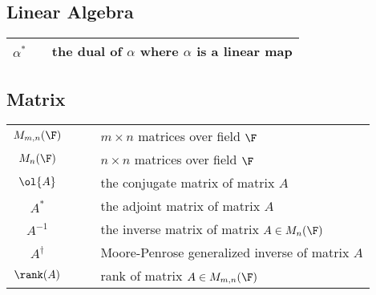 \subsection{Linear Algebra}

\begin{center}
\begin{longtable}{ccl}
\hline
$\alpha^*$ & & the dual of $\alpha$ where $\alpha$ is a linear map\\
\hline
\end{longtable}
\end{center}

\subsection{Matrix}

\begin{center}
\begin{longtable}{ccl}%
\hline
$M_{m,n}(\F)$ & $\quad$ & $m\times n$ matrices over field $\F$\\
$M_{n}(\F)$ & &  $n\times n$ matrices over field $\F$\\
$\ol{A}$ & & the conjugate matrix of matrix $A$\\
$A^*$ & & the adjoint matrix of matrix $A$\\%
$A^{-1}$ & & the inverse matrix of matrix $A\in M_n(\F)$ \\
$A^\dag$ & & Moore-Penrose generalized inverse of matrix $A$\\ %
$\rank(A)$ & & rank of matrix $A\in M_{m,n}(\F)$ \\
\hline
\end{longtable}
\end{center}


